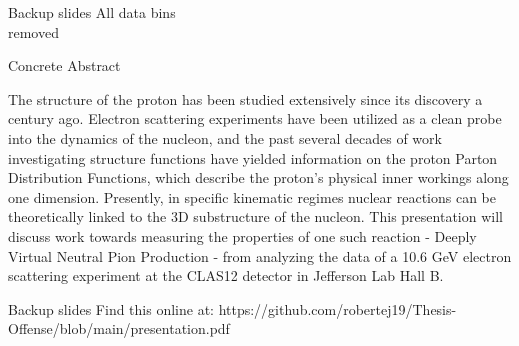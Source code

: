 \documentclass[aspectratio=169]{beamer}
\newcommand*{\myfont}{\fontfamily{lmtt}\selectfont}
\begin{document}
%
%
%



%    







\begin{frame}{Backup slides}
\centering
All data bins\\
removed
\end{frame}



\begin{frame}{Concrete Abstract}

The structure of the proton has been studied extensively since its discovery a century ago.  Electron scattering experiments have been utilized as a clean probe into the dynamics of the nucleon, and the past several decades of work investigating structure functions have yielded information on the proton Parton Distribution Functions, which describe the proton's physical inner workings along one dimension. Presently, in specific kinematic regimes nuclear reactions can be theoretically linked to the 3D substructure of the nucleon. This presentation will discuss work towards measuring the properties of one such reaction - Deeply Virtual Neutral Pion Production - from analyzing the data of a 10.6 GeV electron scattering experiment at the CLAS12 detector in Jefferson Lab Hall B. 

\end{frame}


\begin{frame}{Backup slides}
\centering
    Find this online at: https://github.com/robertej19/Thesis-Offense/blob/main/presentation.pdf
\end{frame}
\end{document}
